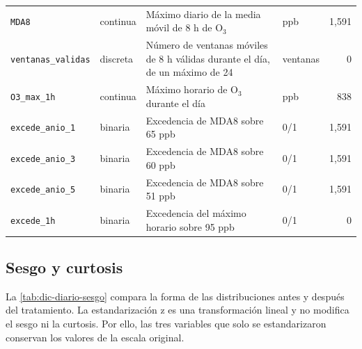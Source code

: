 \begin{table}[t]
\begin{tabular}{llp{8.0cm}lr}
    \texttt{MDA8} & continua & Máximo diario de la media móvil de 8 h de O$_3$
      & ppb & 1,591 \\
    \texttt{ventanas\_validas} & discreta & Número de ventanas móviles de 8 h válidas
      durante el día, de un máximo de 24 & ventanas & 0 \\
    \texttt{O3\_max\_1h} & continua & Máximo horario de O$_3$ durante el día
      & ppb & 838 \\
    \texttt{excede\_anio\_1} & binaria & Excedencia de MDA8 sobre 65 ppb
      & 0/1 & 1,591 \\
    \texttt{excede\_anio\_3} & binaria & Excedencia de MDA8 sobre 60 ppb
      & 0/1 & 1,591 \\
    \texttt{excede\_anio\_5} & binaria & Excedencia de MDA8 sobre 51 ppb
      & 0/1 & 1,591 \\
    \texttt{excede\_1h} & binaria & Excedencia del máximo horario sobre 95 ppb
      & 0/1 & 0 \\
    \bottomrule
  \end{tabular}
\end{table}

\subsection{Sesgo y curtosis}
La \cref{tab:dic-diario-sesgo} compara la forma de las distribuciones antes y
después del tratamiento. La estandarización z es una transformación lineal y no
modifica el sesgo ni la curtosis. Por ello, las tres variables que solo se
estandarizaron conservan los valores de la escala original.

